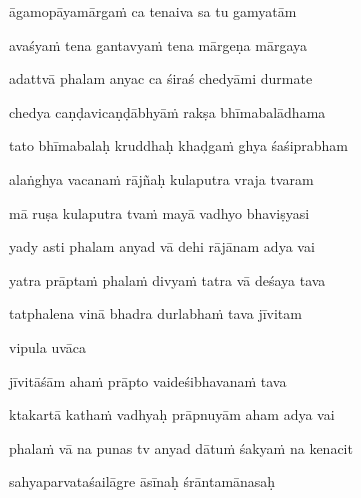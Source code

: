 āgamopāyamārgaṁ ca tenaiva sa tu gamyatām\thinspace{\dandab} \dontdisplaylinenum

avaśyaṁ tena gantavyaṁ tena mārgeṇa mārgaya \veg\dontdisplaylinenum
{}

adattvā phalam anyac ca śiraś chedyāmi durmate\thinspace{\dandab} \dontdisplaylinenum

chedya caṇḍavicaṇḍābhyāṁ rakṣa bhīmabalādhama \veg\dontdisplaylinenum
{}

tato bhīmabalaḥ kruddhaḥ khaḍgaṁ ghya śaśiprabham\thinspace{\dandab} \dontdisplaylinenum

alaṅghya vacanaṁ rājñaḥ kulaputra vraja tvaram \veg\dontdisplaylinenum
{}

mā ruṣa kulaputra tvaṁ mayā vadhyo bhaviṣyasi\thinspace{\dandab} \dontdisplaylinenum

yady asti phalam anyad vā dehi rājānam adya vai \veg\dontdisplaylinenum
{}

yatra prāptaṁ phalaṁ divyaṁ tatra vā deśaya tava\thinspace{\dandab} \dontdisplaylinenum

tatphalena vinā bhadra durlabhaṁ tava jīvitam \veg\dontdisplaylinenum
{}

vipula uvāca~{\dandab}\dontdisplaylinenum 

jīvitāśām ahaṁ prāpto vaideśibhavanaṁ tava\thinspace{\danda} \dontdisplaylinenum

ktakartā kathaṁ vadhyaḥ prāpnuyām aham adya vai \veg\dontdisplaylinenum
{}

phalaṁ vā na punas tv anyad dātuṁ śakyaṁ na kenacit\thinspace{\dandab} \dontdisplaylinenum

sahyaparvataśailāgre āsīnaḥ śrāntamānasaḥ \veg\dontdisplaylinenum
{}

